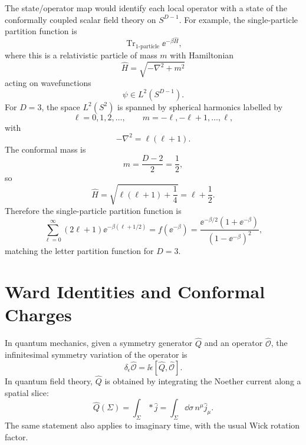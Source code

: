 The state/operator map would identify each local operator with a state
of the conformally coupled scalar field theory on \(S^{D-1}\).  For
example, the single-particle partition function is
\[
  \operatorname{Tr}_{\text{1-particle}}\ee^{-\beta \widehat H},
\]
where this is a relativistic particle of mass \(m\) with Hamiltonian
\[
  \widehat H=\sqrt{-\nabla^2+m^2}
\]
acting on wavefunctions
\[
  \psi\in L^2(S^{D-1}).
\]
For \(D=3\), the space \(L^2(S^2)\) is spanned by spherical harmonics
labelled by
\[
  \ell=0,1,2,\ldots,\qquad m=-\ell,-\ell+1,\ldots,\ell,
\]
with
\[
  -\nabla^2=\ell(\ell+1).
\]
The conformal mass is
\[
  m=\frac{D-2}{2}=\frac12,
\]
so
\[
  \widehat H
  =
  \sqrt{\ell(\ell+1)+\frac14}
  =
  \ell+\frac12.
\]
Therefore the single-particle partition function is
\[
  \sum_{\ell=0}^{\infty}(2\ell+1)\ee^{-\beta(\ell+1/2)}
  =
  f(\ee^{-\beta})
  =
  \frac{\ee^{-\beta/2}(1+\ee^{-\beta})}
  {(1-\ee^{-\beta})^2},
\]
matching the letter partition function for \(D=3\).

\section{Ward Identities and Conformal Charges}

In quantum mechanics, given a symmetry generator \(\widehat Q\) and an
operator \(\widehat{\mathcal O}\), the infinitesimal symmetry variation
of the operator is
\[
  \delta_\epsilon \widehat{\mathcal O}
  =
  \ii\epsilon[\widehat Q,\widehat{\mathcal O}] .
\]
In quantum field theory, \(\widehat Q\) is obtained by integrating the
Noether current along a spatial slice:
\[
  \widehat Q(\Sigma)
  =
  \int_\Sigma *\widehat j
  =
  \int_\Sigma \dd\sigma\, n^\mu \widehat j_\mu .
\]
The same statement also applies to imaginary time, with the usual Wick
rotation factor.

